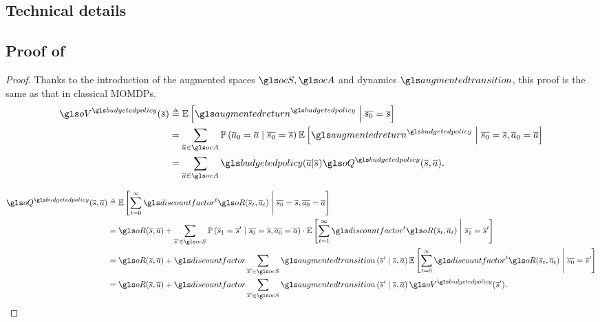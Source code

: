\begin{subappendices}

\section{Technical details}
\label{sec:proofs}
\subsection{Proof of }

\begin{proof}
	Thanks to the introduction of the augmented spaces $\ocS, \ocA$ and dynamics $\augmentedtransition$, this proof is the same as that in classical \glspl{MOMDP}.
	\begin{align*}
	\oV^{\budgetedpolicy}(\os) &\eqdef \expectedvalue\left[ \augmentedreturn^{\budgetedpolicy} \condbar \ov{s_0} = \os\right] \\
	&=\sum_{\oa\in\ocA} \probability{\oa_0 = \oa \condbar\ov{s_0} = \os} \expectedvalue\left[ \augmentedreturn^{\budgetedpolicy} \condbar \ov{s_0} = \os, \oa_0 = \oa\right]\\
	&= \sum_{\oa\in\ocA} \budgetedpolicy(\oa | \os) \oQ^{\budgetedpolicy}(\os,\oa).
	\end{align*}
	
	\begin{align*}
	\oQ^{\budgetedpolicy}(\os, \oa) &\eqdef \expectedvalue\left[\sum_{t=0}^\infty \discountfactor^t \augmentedreward(\os_t, \oa_t)\condbar \ov{s_0} = \os, \ov{a_0} = \oa\right] \\
	&= \augmentedreward(\os, \oa) + \sum_{\os'\in\ocS}\probability{\os_1 = \os' \condbar\ov{s_0} = \os, \ov{a_0} = \oa}\cdot \expectedvalue\left[\sum_{t=1}^\infty \discountfactor^t \augmentedreward(\os_t, \oa_t)\condbar \ov{s_1} = \os'\right] \\
	&= \augmentedreward(\os, \oa) + \discountfactor\sum_{\os'\in\ocS}\augmentedtransition\left(\os' \condbar\os, \oa\right) \expectedvalue\left[\sum_{t=0}^\infty \discountfactor^t \augmentedreward(\os_t, \oa_t) \condbar \ov{s_0} = \os'\right] \\
	&= \augmentedreward(\os, \oa) + \discountfactor\sum_{\os'\in\ocS}\augmentedtransition\left(\os' \condbar\os, \oa\right) \oV^{\budgetedpolicy}(\os').
	\end{align*}
	

\end{proof}
\end{subappendices}
